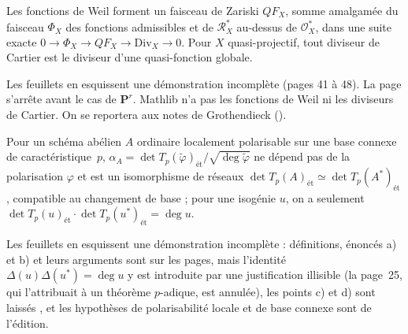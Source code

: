 \begin{encadre}
\begin{theoreme*}\nonverifie
Les fonctions de Weil forment un faisceau de Zariski $QF_X$, somme amalgamée du faisceau $\Phi_X$ des fonctions admissibles et de $\mathcal R^*_X$ au-dessus de $\mathcal O^*_X$, dans une suite exacte $0 \to \Phi_X \to QF_X \to \mathrm{Div}_X \to 0$. Pour $X$ quasi-projectif, tout diviseur de Cartier est le diviseur d'une quasi-fonction globale.
\end{theoreme*}
\end{encadre}
{\small Les feuillets en esquissent une démonstration incomplète (pages 41 à 48). La page s'arrête avant le cas de $\mathbf P^r$. Mathlib n'a pas les fonctions de Weil ni les diviseurs de Cartier. On se reportera aux notes de Grothendieck ().\par}

\begin{encadre}
\begin{theoreme*}\nonverifie
Pour un schéma abélien $A$ ordinaire localement polarisable sur une base connexe de caractéristique~$p$, $\alpha_A = \det T_p(\tilde\varphi)_{\text{ét}}/\sqrt{\deg\tilde\varphi}$ ne dépend pas de la polarisation $\varphi$ et est un isomorphisme de réseaux $\det T_p(A)_{\text{ét}} \simeq \det T_p(A^*)_{\text{ét}}$, compatible au changement de base ; pour une isogénie $u$, on a seulement $\det T_p(u)_{\text{ét}} \cdot \det T_p(u^*)_{\text{ét}} = \deg u$.
\end{theoreme*}
\end{encadre}
{\small Les feuillets en esquissent une démonstration incomplète : définitions, énoncés a) et b) et leurs arguments sont sur les pages, mais l'identité $\Delta(u)\Delta(u^*) = \deg u$ y est introduite par une justification illisible (la page~25, qui l'attribuait à un théorème $p$-adique, est annulée), les points c) et d) sont laissés , et les hypothèses de polarisabilité locale et de base connexe sont de l'édition.\par}

